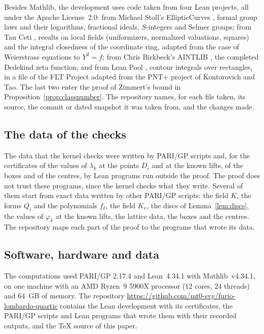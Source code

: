 \documentclass[11pt]{amsart}
\newcommand{\repo}{https://github.com/mt0-svg/furio-lombardo-quartic}
\theoremstyle{definition}
\numberwithin{equation}{section}
\newcommand{\kv}{K_v}
\newcommand{\computed}[1]{\ignorespaces}
\begin{document}
Besides Mathlib, the development uses code taken from four Lean projects, all under the Apache License~2.0: from Michael Stoll's EllipticCurves \cite{StollEC}, formal group laws and their logarithms, fractional ideals, $S$-integers and Selmer groups; from Tau Ceti \cite{TauCeti}, results on local fields (uniformizers, normalized valuations, squares) and the integral closedness of the coordinate ring, adapted from the case of Weierstrass equations to $Y^2=f$; from Chris Birkbeck's AINTLIB \cite{AINTLIB}, the completed Dedekind zeta function; and from Lean Pool \cite{LeanPool}, contour integrals over rectangles, in a file of the FLT Project adapted from the PNT+ project of Kontorovich and Tao. The last two enter the proof of Zimmert's bound in Proposition~\ref{prop:classnumber}. The repository names, for each file taken, its source, the commit or dated snapshot it was taken from, and the changes made.

\subsection{The data of the checks}\label{sec:comp-data}\computed{code/README.md}
The data that the kernel checks were written by PARI/GP scripts and, for the certificates of the values of $\lambda_k$ at the points $D_i$ and at the known lifts, of the boxes and of the centres, by Lean programs run outside the proof. The proof does not trust these programs, since the kernel checks what they write. Several of them start from exact data written by other PARI/GP scripts: the field $K$, the forms $Q_i$ and the polynomials $f_\delta$, the field $\kv$, the discs of Lemma~\ref{lem:discs}, the values of $\varphi_k$ at the known lifts, the lattice data, the boxes and the centres. The repository maps each part of the proof to the programs that wrote its data.

\subsection{Software, hardware and data}\label{sec:comp-soft}\computed{paper/machine.sh, paper/machine.txt}
The computations used PARI/GP 2.17.4 \cite{PARI} and Lean~4.34.1 with Mathlib~v4.34.1, on one machine with an AMD Ryzen~9 5900X processor ($12$ cores, $24$ threads) and $64$~GB of memory. The repository \url{\repo} contains the Lean development with its certificates, the PARI/GP scripts and Lean programs that wrote them with their recorded outputs, and the \TeX{} source of this paper.
\end{document}
